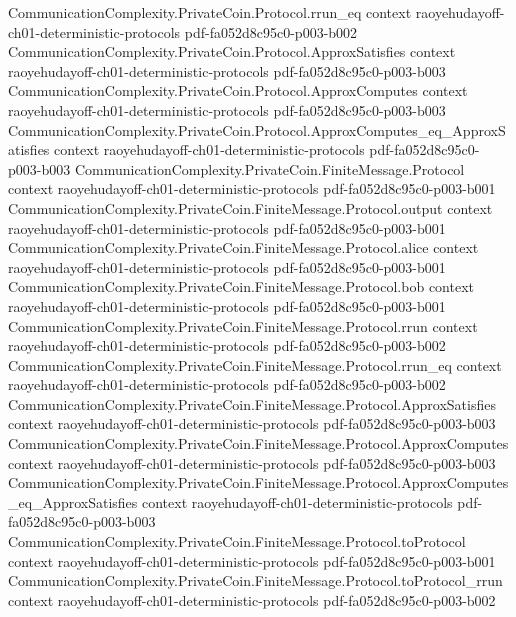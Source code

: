\begin{theorem}
\proofstep
  {CommunicationComplexity.PrivateCoin.Protocol.rrun_eq}
  {context}
  {raoyehudayoff-ch01-deterministic-protocols}
  {pdf-fa052d8c95c0-p003-b002}
\proofstep
  {CommunicationComplexity.PrivateCoin.Protocol.ApproxSatisfies}
  {context}
  {raoyehudayoff-ch01-deterministic-protocols}
  {pdf-fa052d8c95c0-p003-b003}
\proofstep
  {CommunicationComplexity.PrivateCoin.Protocol.ApproxComputes}
  {context}
  {raoyehudayoff-ch01-deterministic-protocols}
  {pdf-fa052d8c95c0-p003-b003}
\proofstep
  {CommunicationComplexity.PrivateCoin.Protocol.ApproxComputes_eq_ApproxSatisfies}
  {context}
  {raoyehudayoff-ch01-deterministic-protocols}
  {pdf-fa052d8c95c0-p003-b003}
\proofstep
  {CommunicationComplexity.PrivateCoin.FiniteMessage.Protocol}
  {context}
  {raoyehudayoff-ch01-deterministic-protocols}
  {pdf-fa052d8c95c0-p003-b001}
\proofstep
  {CommunicationComplexity.PrivateCoin.FiniteMessage.Protocol.output}
  {context}
  {raoyehudayoff-ch01-deterministic-protocols}
  {pdf-fa052d8c95c0-p003-b001}
\proofstep
  {CommunicationComplexity.PrivateCoin.FiniteMessage.Protocol.alice}
  {context}
  {raoyehudayoff-ch01-deterministic-protocols}
  {pdf-fa052d8c95c0-p003-b001}
\proofstep
  {CommunicationComplexity.PrivateCoin.FiniteMessage.Protocol.bob}
  {context}
  {raoyehudayoff-ch01-deterministic-protocols}
  {pdf-fa052d8c95c0-p003-b001}
\proofstep
  {CommunicationComplexity.PrivateCoin.FiniteMessage.Protocol.rrun}
  {context}
  {raoyehudayoff-ch01-deterministic-protocols}
  {pdf-fa052d8c95c0-p003-b002}
\proofstep
  {CommunicationComplexity.PrivateCoin.FiniteMessage.Protocol.rrun_eq}
  {context}
  {raoyehudayoff-ch01-deterministic-protocols}
  {pdf-fa052d8c95c0-p003-b002}
\proofstep
  {CommunicationComplexity.PrivateCoin.FiniteMessage.Protocol.ApproxSatisfies}
  {context}
  {raoyehudayoff-ch01-deterministic-protocols}
  {pdf-fa052d8c95c0-p003-b003}
\proofstep
  {CommunicationComplexity.PrivateCoin.FiniteMessage.Protocol.ApproxComputes}
  {context}
  {raoyehudayoff-ch01-deterministic-protocols}
  {pdf-fa052d8c95c0-p003-b003}
\proofstep
  {CommunicationComplexity.PrivateCoin.FiniteMessage.Protocol.ApproxComputes_eq_ApproxSatisfies}
  {context}
  {raoyehudayoff-ch01-deterministic-protocols}
  {pdf-fa052d8c95c0-p003-b003}
\proofstep
  {CommunicationComplexity.PrivateCoin.FiniteMessage.Protocol.toProtocol}
  {context}
  {raoyehudayoff-ch01-deterministic-protocols}
  {pdf-fa052d8c95c0-p003-b001}
\proofstep
  {CommunicationComplexity.PrivateCoin.FiniteMessage.Protocol.toProtocol_rrun}
  {context}
  {raoyehudayoff-ch01-deterministic-protocols}
  {pdf-fa052d8c95c0-p003-b002}
\proofstep

\end{theorem}
